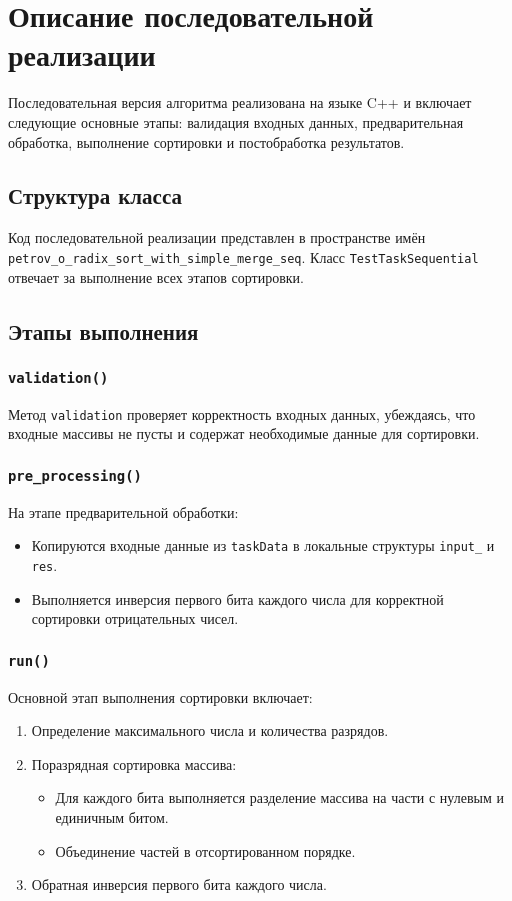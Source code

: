 \documentclass[12pt]{article}
\begin{document}
\section{Описание последовательной реализации}

Последовательная версия алгоритма реализована на языке C++ и включает следующие основные этапы: валидация входных данных, предварительная обработка, выполнение сортировки и постобработка результатов.

\subsection{Структура класса}

Код последовательной реализации представлен в пространстве имён \texttt{petrov\_o\_radix\_sort\_with\_simple\_merge\_seq}. Класс \texttt{TestTaskSequential} отвечает за выполнение всех этапов сортировки.

\subsection{Этапы выполнения}

\subsubsection{\texttt{validation()}}
Метод \texttt{validation} проверяет корректность входных данных, убеждаясь, что входные массивы не пусты и содержат необходимые данные для сортировки.

\subsubsection{\texttt{pre\_processing()}}
На этапе предварительной обработки:
\begin{itemize}
  \item Копируются входные данные из \texttt{taskData} в локальные структуры \texttt{input\_} и \texttt{res}.
  \item Выполняется инверсия первого бита каждого числа для корректной сортировки отрицательных чисел.
\end{itemize}

\subsubsection{\texttt{run()}}
Основной этап выполнения сортировки включает:
\begin{enumerate}
  \item Определение максимального числа и количества разрядов.
  \item Поразрядная сортировка массива:
    \begin{itemize}
      \item Для каждого бита выполняется разделение массива на части с нулевым и единичным битом.
      \item Объединение частей в отсортированном порядке.
    \end{itemize}
  \item Обратная инверсия первого бита каждого числа.
\end{enumerate}
\end{document}
